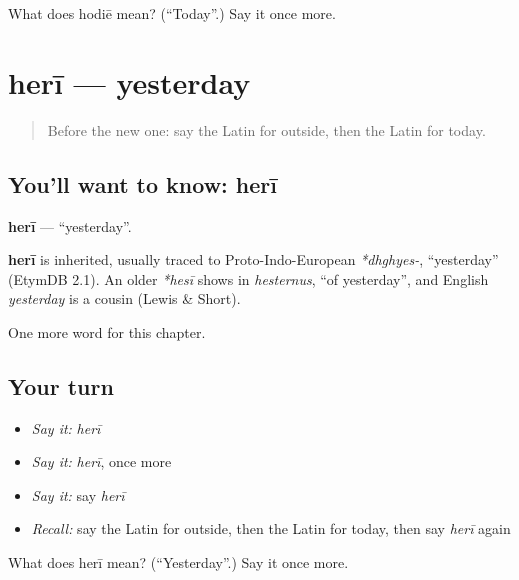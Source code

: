 \begin{tcolorbox}[breakable,colback=teal!4,colframe=teal!35!black,title={Before you move on}]
What does hodiē mean? (\textquotedblleft{}Today\textquotedblright{}.) Say it once more.
\end{tcolorbox}
\section[herī]{herī — yesterday}

\label{lesson:LA-C103-heri}



\begin{quote}
Before the new one: say the Latin for outside, then the Latin for today.
\end{quote}

\subsection*{You'll want to know: herī}
\textbf{herī} — \textquotedblleft{}yesterday\textquotedblright{}.

\begin{cousinweb}
\textbf{herī} is inherited, usually traced to Proto-Indo-European \emph{*dhghyes-}, \textquotedblleft{}yesterday\textquotedblright{} (EtymDB 2.1). An older \emph{*hesī} shows in \emph{hesternus}, \textquotedblleft{}of yesterday\textquotedblright{}, and English \emph{yesterday} is a cousin (Lewis \& Short).
\end{cousinweb}

\begin{grammarlens}[title={What you've built}]
One more word for this chapter.
\end{grammarlens}

\subsection*{Your turn}
\begin{itemize}
\raggedright
  \item \emph{Say it:} \emph{herī}
  \item \emph{Say it:} \emph{herī}, once more
  \item \emph{Say it:} say \emph{herī}
  \item \emph{Recall:} say the Latin for outside, then the Latin for today, then say \emph{herī} again
\end{itemize}

\begin{tcolorbox}[breakable,colback=teal!4,colframe=teal!35!black,title={Before you move on}]
What does herī mean? (\textquotedblleft{}Yesterday\textquotedblright{}.) Say it once more.
\end{tcolorbox}
